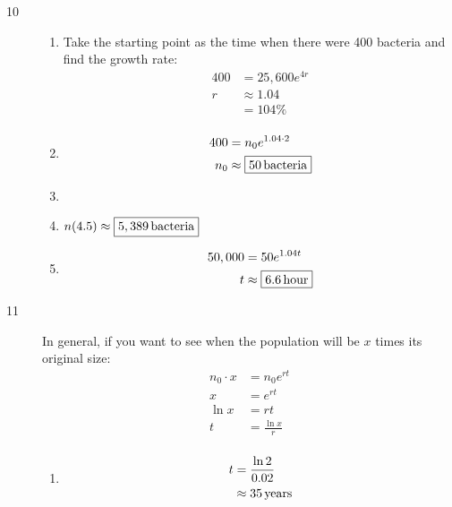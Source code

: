 \documentclass{exam}
\begin{document}
\begin{description}
      \item[10] 
        \begin{enumerate}[a]
          \item Take the starting point as the time when there were 400 bacteria and find the growth rate:
            \begin{align*}
              400 & = 25,600 e^{4r} \\
              r   & \approx 1.04 \\
                  & = \boxed{104\%} \\
            \end{align*}

          \item 
            \begin{align*}
              400 & = n_0 e^{1.04 \cdot 2} \\
              n_0 & \approx \boxed{\unit[50]{bacteria}} \\
            \end{align*}

          \item {}

          \item $n(4.5) \approx \boxed{\unit[5,389]{bacteria}}$

          \item 
            \begin{align*}
              50,000 & = 50 e^{1.04 t} \\
              t      & \approx \boxed{\unit[6.6]{hour}} \\
            \end{align*}
        \end{enumerate}

      \item[11] 
        In general, if you want to see when the population will be $x$ times its original size:
        \begin{align*}
          n_0 \cdot x & = n_0 e^{rt} \\
          x           & =  e^{rt} \\
          \ln x       & = rt \\
          t           & = \frac{\ln x}{r} \\
        \end{align*}

        \begin{enumerate}[a]
          \item 
            \begin{align*}
              t & = \frac{\ln 2}{0.02} \\
                & \approx \unit[35]{years} \\
            \end{align*}


\end{enumerate}
\end{description}
\end{document}
